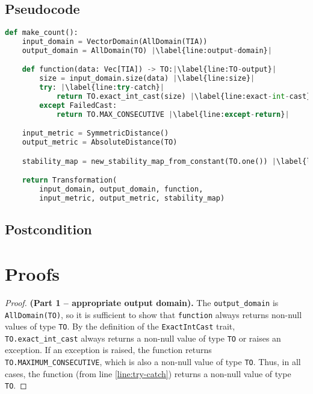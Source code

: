 \documentclass{article}
\begin{document}
\subsection*{Pseudocode}
\begin{lstlisting}[language = Python, escapechar=|]
def make_count():
    input_domain = VectorDomain(AllDomain(TIA))
    output_domain = AllDomain(TO) |\label{line:output-domain}|

    def function(data: Vec[TIA]) -> TO:|\label{line:TO-output}|
        size = input_domain.size(data) |\label{line:size}|
        try: |\label{line:try-catch}|
            return TO.exact_int_cast(size) |\label{line:exact-int-cast}|
        except FailedCast:
            return TO.MAX_CONSECUTIVE |\label{line:except-return}|

    input_metric = SymmetricDistance()
    output_metric = AbsoluteDistance(TO)

    stability_map = new_stability_map_from_constant(TO.one()) |\label{line:stability-map}|

    return Transformation(
        input_domain, output_domain, function,
        input_metric, output_metric, stability_map)
\end{lstlisting}

\subsection*{Postcondition}

\section{Proofs}

\begin{proof} \textbf{(Part 1 -- appropriate output domain).}
    The \texttt{output\_domain} is \texttt{AllDomain(TO)}, so it is sufficient to show that \texttt{function} always returns non-null values of type \texttt{TO}.
    By the definition of the \texttt{ExactIntCast} trait, \texttt{TO.exact\_int\_cast} always returns a non-null value of type \texttt{TO} or raises an exception.
    If an exception is raised, the function returns \texttt{TO.MAXIMUM\_CONSECUTIVE}, which is also a non-null value of type \texttt{TO}.
    Thus, in all cases, the function (from line \ref{line:try-catch}) returns a non-null value of type \texttt{TO}.
\end{proof}
\end{document}
